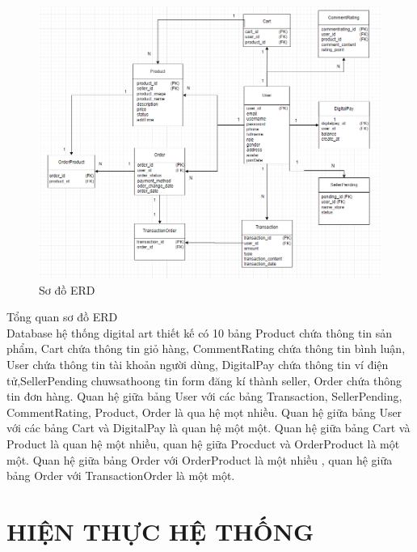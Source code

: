 \documentclass{article}
\begin{document}
{{{{{{{{{{{{{{{{{{		\begin{center}
		\begin{figure}[htp]
			\begin{center}
				\includegraphics[scale=.700]{anh27.png}
			\end{center}
			\caption{Sơ đồ ERD}
			
		\end{figure}
	\end{center}
}


\newpage
{\large  Tổng quan sơ đồ ERD\\
	\indent Database hệ thống digital art thiết kế có 10 bảng Product chứa thông tin sản phẩm, Cart chứa thông tin giỏ hàng, CommentRating chứa thông tin bình luận, User chứa thông tin tài khoản người dùng, DigitalPay chứa thông tin ví điện tử,SellerPending chuwsathoong tin form đăng kí thành seller, Order chứa thông tin đơn hàng. Quan hệ giữa bảng User với các bảng Transaction, SellerPending, CommentRating, Product, Order là qua hệ mọt nhiều. Quan hệ giữa bảng User với các bảng Cart và DigitalPay là quan hệ một một. Quan hệ giữa bảng Cart và Product là quan hệ một nhiều, quan hệ giữa Procduct và OrderProduct là một một. Quan hệ giữa bảng Order với OrderProduct là một nhiều , quan hệ giữa bảng Order với TransactionOrder là một một.
	
	
}




\newpage
\section{HIỆN THỰC HỆ THỐNG}
\label{sec:Hiện thực hệ thống}
}}}}}}}}}}}}}}}}}
\end{document}
